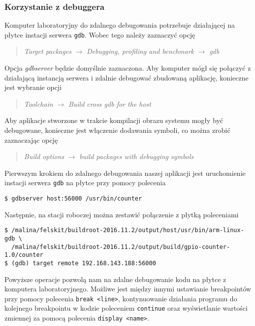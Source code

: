 \documentclass[10pt,a4paper]{article}
\begin{document}
\subsubsection{Korzystanie z debuggera}
Komputer laboratoryjny do zdalnego debugowania potrzebuje działającej na płytce instacji serwera \texttt{gdb}. Wobec tego należy zaznaczyć opcję
\begin{quote}
	\textit{Target packages} $\rightarrow$ \textit{Debugging, profiling and benchmark} $\rightarrow$ \textit{gdb}
\end{quote}
Opcja \textit{gdbserver} będzie domyślnie zaznaczona. Aby komputer mógł się połączyć z działającą instancją serwera i zdalnie debugować zbudowaną aplikację, konieczne jest wybranie opcji
\begin{quote}
	\textit{Toolchain} $\rightarrow$ \textit{Build cross gdb for the host}
\end{quote}
Aby aplikacje stworzone w trakcie kompilacji obrazu systemu mogły być debugowane, konieczne jest włączenie dodawania symboli, co można zrobić zaznaczając opcję
\begin{quote}
	\textit{Build options} $\rightarrow$ \textit{build packages with debugging symbols}
\end{quote}
Pierwszym krokiem do zdalnego debugowania naszej aplikacji jest uruchomienie instacji serwera \texttt{gdb} na płytce przy pomocy polecenia
\begin{lstlisting}[style=bash]
$ gdbserver host:56000 /usr/bin/counter
\end{lstlisting}
Następnie, na stacji roboczej można zestawić połączenie z płytką poleceniami
\begin{lstlisting}[style=bash]
$ /malina/felskit/buildroot-2016.11.2/output/host/usr/bin/arm-linux-gdb \ 
  /malina/felskit/buildroot-2016.11.2/output/build/gpio-counter-1.0/counter
$ (gdb) target remote 192.168.143.188:56000
\end{lstlisting}
Powyższe operacje pozwolą nam na zdalne debugowanie kodu na płytce z komputera laboratoryjnego. Możliwe jest między innymi ustawianie breakpointów przy pomocy polecenia \texttt{break <line>}, kontynuowanie działania programu do kolejnego breakpointu w kodzie poleceniem \texttt{continue} oraz wyświetlanie wartości zmiennej za pomocą polecenia \texttt{display <name>}.
\end{document}
